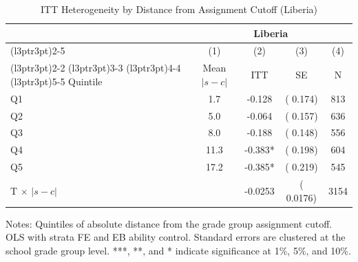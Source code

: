 \begin{table}[H]
\centering
\caption{ITT Heterogeneity by Distance from Assignment Cutoff (Liberia)}
\label{tab:cutoff_het}
\begin{threeparttable}
\begin{tabular}[t]{lcccc}
\toprule
\multicolumn{1}{c}{ } & \multicolumn{4}{c}{Liberia} \\
\cmidrule(l{3pt}r{3pt}){2-5}
\multicolumn{1}{c}{ } & \multicolumn{1}{c}{(1)} & \multicolumn{1}{c}{(2)} & \multicolumn{1}{c}{(3)} & \multicolumn{1}{c}{(4)} \\
\cmidrule(l{3pt}r{3pt}){2-2} \cmidrule(l{3pt}r{3pt}){3-3} \cmidrule(l{3pt}r{3pt}){4-4} \cmidrule(l{3pt}r{3pt}){5-5}
Quintile & Mean $|s-c|$ & ITT & SE & N \\
\midrule
Q1 &   1.7 &  -0.128 & (  0.174) & 813 \\
Q2 &   5.0 &  -0.064 & (  0.157) & 636 \\
Q3 &   8.0 &  -0.188 & (  0.148) & 556 \\
Q4 &  11.3 &  -0.383* & (  0.198) & 604 \\
Q5 &  17.2 &  -0.385* & (  0.219) & 545 \\
\midrule
T $\times$ $|s-c|$ & & -0.0253 & ( 0.0176) & 3154 \\
\bottomrule
\end{tabular}
\begin{tablenotes}[para]
\item Notes: Quintiles of absolute distance from the grade group assignment cutoff. OLS with strata FE and EB ability control. Standard errors are clustered at the school grade group level. ***, **, and * indicate significance at 1\%, 5\%, and 10\%.
\end{tablenotes}
\end{threeparttable}
\end{table}
